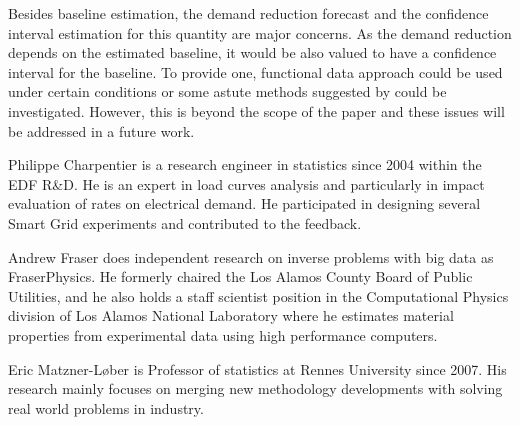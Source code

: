\documentclass[journal]{IEEEtran}
\begin{document}
Besides baseline estimation, the demand reduction forecast and the
confidence interval estimation for this quantity are major
concerns. As the demand reduction depends on the estimated baseline,
it would be also valued to have a confidence interval for the
baseline. To provide one, functional data approach could be used under
certain conditions or some astute methods suggested by \cite{interval}
could be investigated. However, this is beyond the scope of the paper
and these issues will be addressed in a future work.




\begin{IEEEbiographynophoto}{Philippe Charpentier}
is a research engineer in statistics since 2004 within the EDF
R\&D. He is an expert in load curves analysis and particularly in
impact evaluation of rates on electrical demand. He participated in
designing several Smart Grid experiments and contributed to the
feedback.
\end{IEEEbiographynophoto}

\begin{IEEEbiographynophoto}{Andrew Fraser}
  does independent research on inverse problems with big data as
  FraserPhysics.  He formerly chaired the Los Alamos County Board of
  Public Utilities, and he also holds a staff scientist position in
  the Computational Physics division of Los Alamos National Laboratory
  where he estimates material properties from experimental data using
  high performance computers.
\end{IEEEbiographynophoto}

\begin{IEEEbiographynophoto}{Eric Matzner-L{\o}ber}
is Professor of statistics at Rennes University since 2007. His
research mainly focuses on merging new methodology developments with
solving real world problems in industry.
\end{IEEEbiographynophoto}
\end{document}
